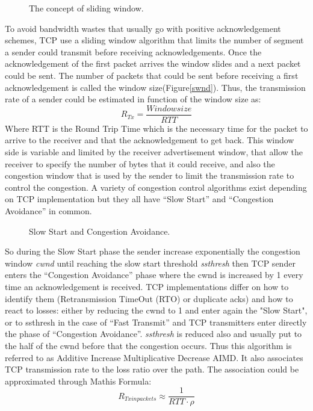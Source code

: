 \begin{figure}[h]
\begin{center}
\caption{
  The concept of sliding window.
  \label{fig:swnd}
}
\end{center}
\end{figure}

To avoid bandwidth wastes that usually go with positive acknowledgement schemes, TCP use a sliding window algorithm that limits the number of segment a sender could transmit before receiving acknowledgements. Once the acknowledgement of the first packet arrives the window slides and a next packet could be sent. The number of packets that could be sent before receiving a first acknowledgement is called the window size(Figure\ref{swnd}). Thus, the transmission rate of a sender could be estimated in function of the window size as:
\begin{equation}
R_{Tx} = \frac{Window size}{RTT}
\end{equation}
Where RTT is the Round Trip Time which is the necessary time for the packet to arrive to the receiver and that the acknowledgement to get back. This window side is variable and limited by the receiver advertisement window, that allow the receiver to specify the number of bytes that it could receive, and also the congestion window that is used by the sender to limit the transmission rate to control the congestion. A variety of congestion control algorithms exist depending on TCP implementation but they all have “Slow Start” and “Congestion Avoidance” in common. 

 \begin{figure}[h]
  \begin{center}
\caption{
  Slow Start and Congestion Avoidance.
    \label{fig:SSCA}
}
 \end{center}
\end{figure}

So during the Slow Start phase the sender increase exponentially the congestion window {\it cwnd} until reaching the slow start threshold {\it ssthresh} then TCP sender enters the “Congestion Avoidance” phase where the cwnd is increased by 1 every time an acknowledgement is received.
TCP implementations differ on how to identify them (Retransmission TimeOut (RTO) or duplicate acks) and how to react to losses: either by reducing the cwnd to 1 and enter again the "Slow Start", or to ssthresh in the case of “Fast Transmit” and TCP transmitters enter directly the phase of  “Congestion Avoidance”. {\it ssthresh} is reduced also and usually put to the half of the cwnd before that the congestion occurs. Thus this algorithm is referred to as Additive Increase Multiplicative Decrease AIMD. It also associates TCP transmission rate to the loss ratio over the path. The association could be approximated through Mathis Formula:
\begin{equation}
R_{Tx in packets} \approx \frac{1}{RTT \cdot \rho}
\end{equation}

